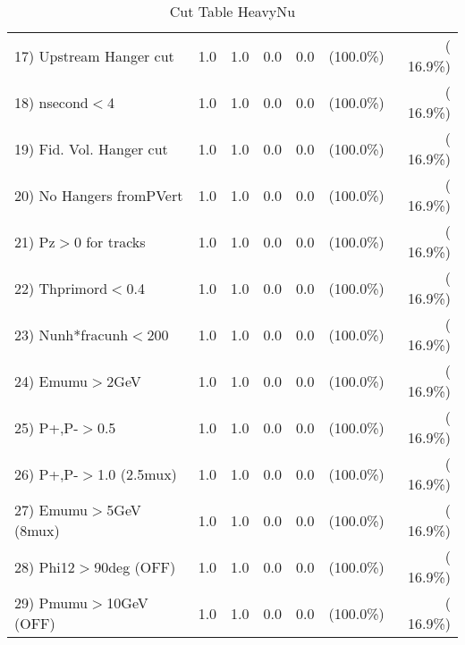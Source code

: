 \begin{table}[h!]
\begin{tabular}{||l||r|r|r|r|r|r||}
 17) Upstream Hanger cut  &          1.0 &          1.0 &          0.0 &          0.0 & (100.0\%) & ( 16.9\%) \\
 18) nsecond$<$4          &          1.0 &          1.0 &          0.0 &          0.0 & (100.0\%) & ( 16.9\%) \\
 19) Fid. Vol. Hanger cut &          1.0 &          1.0 &          0.0 &          0.0 & (100.0\%) & ( 16.9\%) \\
 20) No Hangers fromPVert &          1.0 &          1.0 &          0.0 &          0.0 & (100.0\%) & ( 16.9\%) \\
 21) Pz$>$0 for tracks    &          1.0 &          1.0 &          0.0 &          0.0 & (100.0\%) & ( 16.9\%) \\
 22) Thprimord$<$0.4      &          1.0 &          1.0 &          0.0 &          0.0 & (100.0\%) & ( 16.9\%) \\
 23) Nunh*fracunh$<$200   &          1.0 &          1.0 &          0.0 &          0.0 & (100.0\%) & ( 16.9\%) \\
 24) Emumu$>$2GeV         &          1.0 &          1.0 &          0.0 &          0.0 & (100.0\%) & ( 16.9\%) \\
 25) P+,P-$>$0.5          &          1.0 &          1.0 &          0.0 &          0.0 & (100.0\%) & ( 16.9\%) \\
 26) P+,P-$>$1.0 (2.5mux) &          1.0 &          1.0 &          0.0 &          0.0 & (100.0\%) & ( 16.9\%) \\
 27) Emumu$>$5GeV  (8mux) &          1.0 &          1.0 &          0.0 &          0.0 & (100.0\%) & ( 16.9\%) \\
 28) Phi12$>$90deg  (OFF) &          1.0 &          1.0 &          0.0 &          0.0 & (100.0\%) & ( 16.9\%) \\
 29) Pmumu$>$10GeV  (OFF) &          1.0 &          1.0 &          0.0 &          0.0 & (100.0\%) & ( 16.9\%) \\
 \hline
 \hline
 \end{tabular}
 \caption{Cut Table  HeavyNu  }
 \label{tab-cutheavy_neutrino}
 \end{table}
